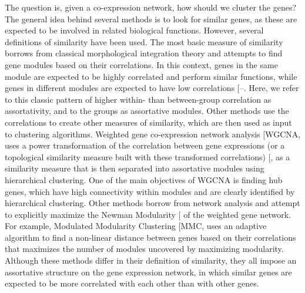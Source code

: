 \documentclass[
]{article}
\begin{document}
The question is, given a co-expression network, how should we cluster
the genes? The general idea behind several methods is to look for
similar genes, as these are expected to be involved in related
biological functions. However, several definitions of similarity have
been used. The most basic measure of similarity borrows from classical
morphological integration theory and attempts to find gene modules based
on their correlations. In this context, genes in the same module are
expected to be highly correlated and perform similar functions, while
genes in different modules are expected to have low correlations
{[}--\citeproc{ref-Wagner2007-jt}{7}{]}.
Here, we refer to this classic pattern of higher within- than
between-group correlation as assortativity, and to the groups as
assortative modules. Other methods use the correlations to create other
measures of similarity, which are then used as input to clustering
algorithms. Weighted gene co-expression network analysis {[}WGCNA,
\citeproc{ref-Langfelder2008-qa}{3}{]} uses a power transformation of
the correlation between gene expressions (or a topological similarity
measure built with these transformed correlations)
{[},\citeproc{ref-Dong2007-ff}{9}{]} as a
similarity measure that is then separated into assortative modules using
hierarchical clustering. One of the main objectives of WGCNA is finding
hub genes, which have high connectivity within modules and are clearly
identified by hierarchical clustering. Other methods borrow from network
analysis and attempt to explicitly maximize the Newman Modularity
{[}\citeproc{ref-Newman2006-fv}{10}{]} of the weighted gene network. For
example, Modulated Modularity Clustering {[}MMC,
\citeproc{ref-Stone2009-hv}{11}{]} uses an adaptive algorithm to find a
non-linear distance between genes based on their correlations that
maximizes the number of modules uncovered by maximizing modularity.
Although these methods differ in their definition of similarity, they
all impose an assortative structure on the gene expression network, in
which similar genes are expected to be more correlated with each other
than with other genes.
\end{document}

